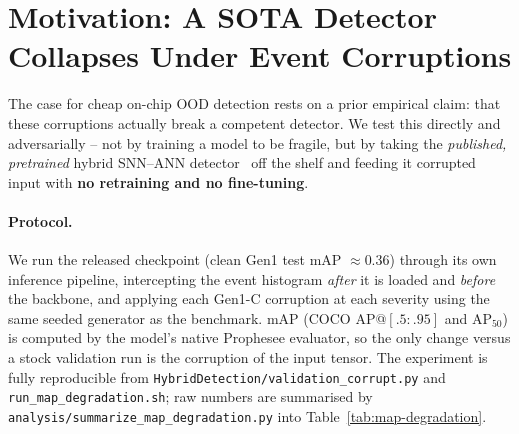 \section{Motivation: A SOTA Detector Collapses Under Event Corruptions}
\label{sec:motivation}

The case for cheap on-chip OOD detection rests on a prior empirical claim: that these
corruptions actually break a competent detector. We test this directly and adversarially --
not by training a model to be fragile, but by taking the \emph{published, pretrained} hybrid
SNN--ANN detector~\cite{neftci2025hybrid} off the shelf and feeding it corrupted input with
\textbf{no retraining and no fine-tuning}.

\paragraph{Protocol.}
We run the released checkpoint (clean Gen1 test mAP $\approx 0.36$) through its own
inference pipeline, intercepting the event histogram \emph{after} it is loaded and
\emph{before} the backbone, and applying each Gen1-C corruption at each severity using the
same seeded generator as the benchmark. mAP (COCO AP@$[.5{:}.95]$ and AP$_{50}$) is computed
by the model's native Prophesee evaluator, so the only change versus a stock validation run
is the corruption of the input tensor. The experiment is fully reproducible from
\texttt{HybridDetection/validation\_corrupt.py} and \texttt{run\_map\_degradation.sh}; raw
numbers are summarised by \texttt{analysis/summarize\_map\_degradation.py} into
Table~\ref{tab:map-degradation}.

\begin{table}[t]
  \centering
  \caption{Detection mAP of the pretrained hybrid detector under each corruption and
  severity (no retraining). \emph{Numbers pending the GPU sweep -- see
  Docs/paper\_figures.md once banked.}}
  \label{tab:map-degradation}
\end{table}

